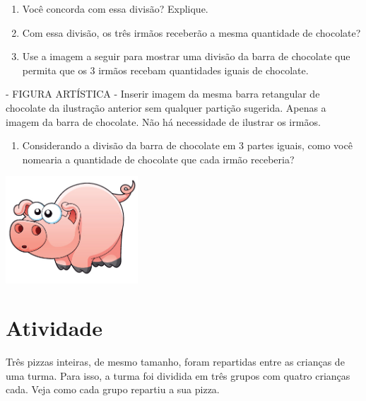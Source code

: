 \documentclass[a4,12pt]{book}
\begin{document}
\begin{enumerate} [\quad a)] %
  \item     Você concorda com essa divisão? Explique.
  \item     Com essa divisão, os três irmãos receberão a mesma quantidade de chocolate?
  \item     Use a imagem a seguir para mostrar uma divisão da barra de chocolate que permita que os 3 irmãos recebam quantidades iguais de chocolate.
\end{enumerate} %
\begin{imagem*}[breakable]{}{}    - FIGURA ARTÍSTICA - Inserir imagem da mesma barra retangular de chocolate da ilustração anterior sem qualquer partição sugerida. Apenas a imagem da barra de chocolate. Não há necessidade de ilustrar os irmãos.\end{imagem*}
\begin{enumerate} [\quad a)] %
  \item     Considerando a divisão da barra de chocolate em 3 partes iguais, como você nomearia a quantidade de chocolate que cada irmão receberia?
\end{enumerate} %









\includegraphics[width=\textwidth,height=4cm, keepaspectratio]{pig}
\section{Atividade}







Três pizzas inteiras, de mesmo tamanho, foram repartidas entre as crianças de uma turma. Para isso, a turma foi dividida em três grupos com quatro crianças cada. Veja como cada grupo repartiu a sua pizza.
\end{document}
